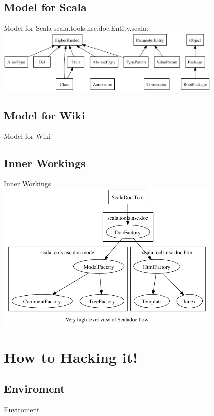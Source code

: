 \documentclass{beamer}
\begin{document}
\subsection{Model for Scala}
\begin{frame}{Model for Scala}  
	scala.tools.nsc.doc.Entity.scala:
	\includegraphics[width=11cm]{../docs/ScaladocModelScala.png} %
\end{frame}

\subsection{Model for Wiki}
\begin{frame}{Model for Wiki} 
	
\end{frame}

\subsection{Inner Workings}
\begin{frame}{Inner Workings} 
	\includegraphics[width=11cm]{../docs/flow.png} 
\end{frame}

\section{How to Hacking it!}

\subsection{Enviroment}
\begin{frame}{Enviroment} 
	
\end{frame}
\end{document}
